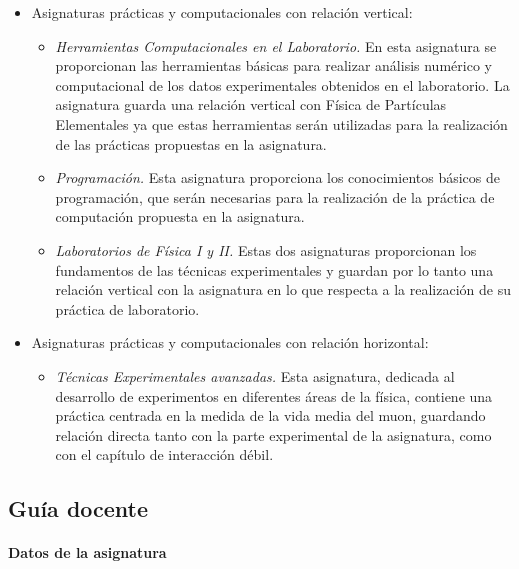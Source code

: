 \begin{itemize}
\begin{itemize}
    \end{itemize}
\item Asignaturas prácticas y computacionales con relación vertical:
    \begin{itemize}
    \item \emph{Herramientas Computacionales en el Laboratorio.} En esta asignatura se proporcionan las herramientas básicas para realizar análisis numérico y computacional de los datos experimentales obtenidos en el laboratorio. La asignatura guarda una relación vertical con Física de Partículas Elementales ya que estas herramientas serán utilizadas para la realización de las prácticas propuestas en la asignatura.
    \item \emph{Programación.} Esta asignatura proporciona los conocimientos básicos de programación, que serán necesarias para la realización de la práctica de computación propuesta en la asignatura. 
    \item \emph{Laboratorios de Física I y II.} Estas dos asignaturas proporcionan los fundamentos de las técnicas experimentales y guardan por lo tanto una relación vertical con la asignatura en lo que respecta a la realización de su práctica de laboratorio.
    \end{itemize}
\item Asignaturas prácticas y computacionales con relación horizontal:
\begin{itemize}
    \item \emph{Técnicas Experimentales avanzadas.} Esta asignatura, dedicada al desarrollo de experimentos en diferentes áreas de la física, contiene una práctica centrada en la medida de la vida media del muon, guardando relación directa tanto con la parte experimental de la asignatura, como con el capítulo de interacción débil.
\end{itemize}
\end{itemize}

\newpage

\subsection{Guía docente}

\paragraph{Datos de la asignatura}


